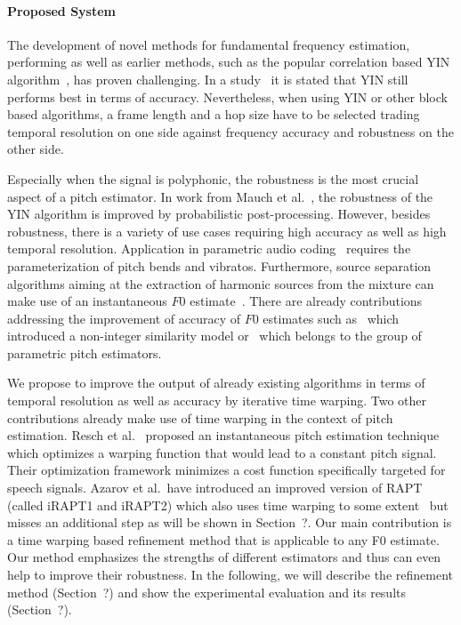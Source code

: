 \paragraph{Proposed System}
%
The development of novel methods for fundamental frequency estimation, performing as well as earlier methods, such as the popular correlation based \textsc{YIN} algorithm~\cite{de2002yin}, has proven challenging.
In a study~\cite{babacan2013comparative} it is stated that YIN still performs best in terms of accuracy.
Nevertheless, when using YIN or other block based algorithms, a frame length and a hop size have to be selected trading temporal resolution on one side against frequency accuracy and robustness on the other side.

Especially when the signal is polyphonic, the robustness is the most crucial aspect of a pitch estimator. In work from Mauch et al.~\cite{mauch2014pyin}, the robustness of the \textsc{YIN} algorithm is improved by probabilistic post-processing. However, besides robustness, there is a variety of use cases requiring high accuracy as well as high temporal resolution. Application in parametric audio coding~\cite{purnhagen2000hiln} requires the parameterization of pitch bends and vibratos. Furthermore, source separation algorithms aiming at the extraction of harmonic sources from the mixture can make use of an instantaneous $F0$ estimate~\cite{virtanen2008combining, stoterunison}. There are already contributions addressing the improvement of accuracy of $F0$ estimates such as~\cite{medan1991super} which introduced a non-integer similarity model or~\cite{christensen2007joint} which belongs to the group of parametric pitch estimators.

We propose to improve the output of already existing algorithms in terms of temporal resolution as well as accuracy by iterative time warping. Two other contributions already make use of time warping in the context of pitch estimation. Resch et al.~\cite{resch} proposed an instantaneous pitch estimation technique which optimizes a warping function that would lead to a constant pitch signal. Their optimization framework minimizes a cost function specifically targeted for speech signals. Azarov et al.\ have introduced an improved version of RAPT (called iRAPT1 and iRAPT2) which also uses time warping to some extent~\cite{azarov2012instantaneous} but misses an additional step as will be shown in Section~?.
Our main contribution is a time warping based refinement method that is applicable to any F0 estimate. Our method emphasizes the strengths of different estimators and thus can even help to improve their robustness. In the following, we will describe the refinement method (Section~?) and show the experimental evaluation and its results (Section~?).

